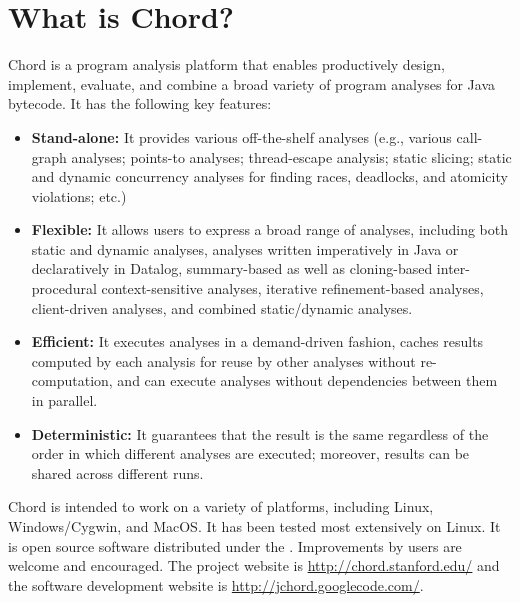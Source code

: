 \section{What is Chord?}
\label{sec:whatis-chord}

Chord is a program analysis platform that enables 
productively design, implement, evaluate, and combine a
broad variety of program analyses for Java bytecode. It has the
following key features:

\begin{itemize}
\item
{\bf Stand-alone:} It provides various off-the-shelf analyses (e.g., various
call-graph analyses; points-to analyses; thread-escape analysis;
static slicing; static and dynamic concurrency analyses for finding
races, deadlocks, and atomicity violations; etc.)

\item
{\bf Flexible:} It allows users to express a broad range of analyses,
including both static and dynamic analyses, analyses written
imperatively in Java or declaratively in Datalog, summary-based as
well as cloning-based inter-procedural context-sensitive analyses,
iterative refinement-based analyses, client-driven analyses, and
combined static/dynamic analyses.

\item
{\bf Efficient:} It executes analyses in a demand-driven fashion, caches
results computed by each analysis for reuse by other analyses without
re-computation, and can execute analyses without dependencies between
them in parallel.

\item
{\bf Deterministic:} It guarantees that the result is the same regardless of
the order in which different analyses are executed; moreover, results
can be shared across different runs.
\end{itemize}

\noindent Chord is intended to work on a variety of platforms,
including Linux, Windows/Cygwin, and MacOS.  It has been tested most
extensively on Linux.  It is open source software distributed under
the .
Improvements by users are welcome and encouraged.  The project website
is \url{http://chord.stanford.edu/} and the software development website is
\url{http://jchord.googlecode.com/}.


